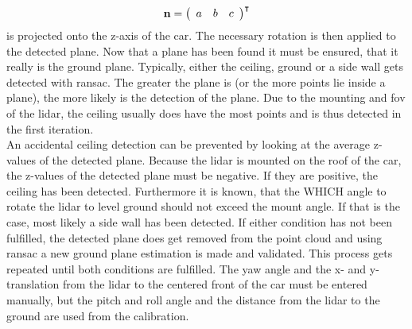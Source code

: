 \begin{equation}
    \vb{n} = \left(\begin{array}{lll} a & b & c \end{array}\right)^{\intercal}
\end{equation}
is projected onto the z-axis of the car.
The necessary rotation is then applied to the detected plane.
Now that a plane has been found it must be ensured, that it really is the ground plane.
Typically, either the ceiling, ground or a side wall gets detected with \gls{ransac}.
The greater the plane is (or the more points lie inside a plane), the more likely is the detection of the plane.
Due to the mounting and \gls{fov} of the \gls{lidar}, the ceiling usually does have the most points and is thus detected in the first iteration.\\
An accidental ceiling detection can be prevented by looking at the average z-values of the detected plane.
Because the lidar is mounted on the roof of the car, the z-values of the detected plane must be negative.
If they are positive, the ceiling has been detected.
Furthermore it is known, that the WHICH angle to rotate the lidar to level ground should not exceed the mount angle.
If that is the case, most likely a side wall has been detected.
If either condition has not been fulfilled, the detected plane does get removed from the point cloud and using \gls{ransac} a new ground plane estimation is made and validated.
This process gets repeated until both conditions are fulfilled.
The yaw angle and the x- and y-translation from the \gls{lidar} to the centered front of the car
must be entered manually, but the pitch and roll angle and the distance from the \gls{lidar} to the ground are used from the calibration.


